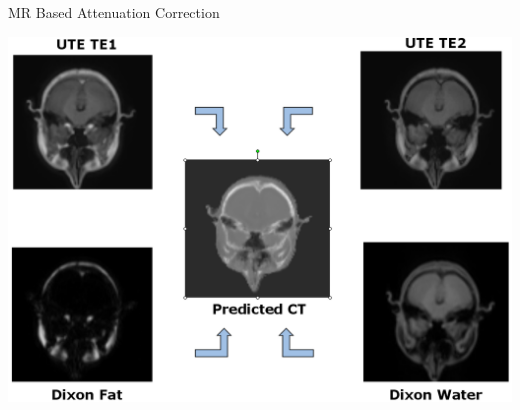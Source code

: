 
\begin{frame}{MR Based Attenuation Correction}
    \begin{center}\includegraphics[height=0.8\textheight]{images/mr_ac}\\
    \end{center}
\end{frame}







